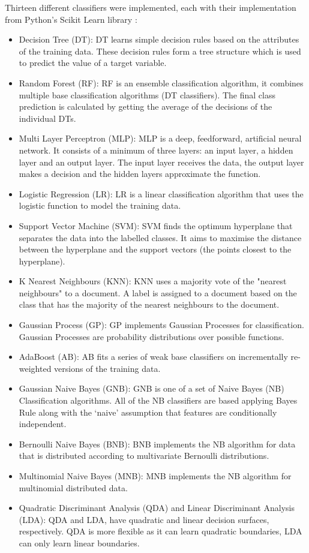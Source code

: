 Thirteen different classifiers were implemented, each with their implementation from Python's Scikit Learn library \cite{scikit-learn}:
\begin{itemize}
    \item Decision Tree (DT): DT learns simple decision rules based on the attributes of the training data. These decision rules form a tree structure which is used to predict the value of a target variable.
    \item Random Forest (RF): RF is an ensemble classification algorithm, it combines multiple base classification algorithms (DT classifiers). The final class prediction is calculated by getting the average of the decisions of the individual DTs.
    \item Multi Layer Perceptron (MLP): MLP is a deep, feedforward, artificial neural network. It consists of a minimum of three layers: an input layer, a hidden layer and an output layer. The input layer receives the data, the output layer makes a decision and the hidden layers approximate the function.
    \item Logistic Regression (LR): LR is a linear classification algorithm that uses the logistic function to model the training data. 
    \item Support Vector Machine (SVM): SVM finds the optimum hyperplane that separates the data into the labelled classes. It aims to maximise the distance between the hyperplane and the support vectors (the points closest to the hyperplane).
    \item K Nearest Neighbours (KNN): KNN uses a majority vote of the "nearest neighbours" to a document. A label is assigned to a document based on the class that has the majority of the nearest neighbours to the document.
    \item Gaussian Process (GP): GP implements Gaussian Processes for classification. Gaussian Processes are probability distributions over possible functions.
    \item AdaBoost (AB): AB fits a series of weak base classifiers on incrementally re-weighted versions of the training data.
    \item Gaussian Naive Bayes (GNB): GNB is one of a set of Naive Bayes (NB) Classification algorithms. All of the NB classifiers are based applying Bayes Rule along with the ‘naive’ assumption that features are conditionally independent.
    \item Bernoulli Naive Bayes (BNB): BNB implements the NB algorithm for data that is distributed according to multivariate Bernoulli distributions.
    \item Multinomial Naive Bayes (MNB): MNB implements the NB algorithm for multinomial distributed data.
    \item Quadratic Discriminant Analysis (QDA) and Linear Discriminant Analysis (LDA): QDA and LDA, have quadratic and linear decision surfaces, respectively. QDA is more flexible as it can learn quadratic boundaries, LDA can only learn linear boundaries. 
\end{itemize}


